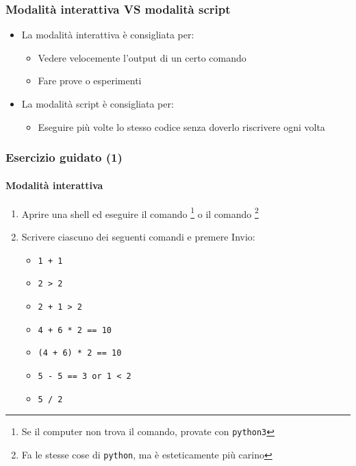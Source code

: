 \begin{contentframe}
    \frametitle{Modalità interattiva VS modalità script}

    \begin{itemize}
        \item La modalità interattiva è consigliata per:
        \begin{itemize}
            \item Vedere velocemente l'output di un certo comando
            \item Fare prove o esperimenti
        \end{itemize}

        \bigskip
        \item La modalità script è consigliata per:
        \begin{itemize}
            \item Eseguire più volte lo stesso codice senza doverlo riscrivere ogni volta
        \end{itemize}
    \end{itemize}
\end{contentframe}


\begin{exerciseframe}
    \frametitle{Esercizio guidato (1)}
    \framesubtitle{Modalità interattiva}

    \begin{enumerate}
        \item Aprire una shell ed eseguire il comando \footnote[frame]{Se il computer non trova il comando, provate con \texttt{python3}} o il comando \footnote[frame]{Fa le stesse cose di \texttt{python}, ma è esteticamente più carino}
        \item Scrivere ciascuno dei seguenti comandi e premere Invio:
            \begin{itemize}
                \item \texttt{1 + 1}
                \pause
                \item \texttt{2 > 2}
                \pause
                \item \texttt{2 + 1 > 2}
                \item \texttt{4 + 6 * 2 == 10}
                \item \texttt{(4 + 6) * 2 == 10}
                \item \texttt{5 - 5 == 3 or 1 < 2}
                \item \texttt{5 / 2}
            \end{itemize}
    \end{enumerate}
\end{exerciseframe}

